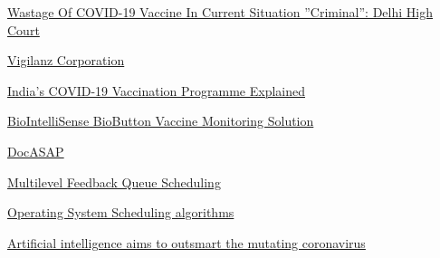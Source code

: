\documentclass[10pt,twocolumn,letterpaper]{article}
\begin{document}
\begin{thebibliography}{9}

\href{https://www.ndtv.com/india-news/delhi-high-court-says-wastage-of-covid-19-vaccine-in-current-situation-criminal-2418287}{Wastage Of COVID-19 Vaccine In Current Situation ''Criminal'': Delhi High Court}

\href{https://vigilanzcorp.com/}{Vigilanz Corporation}

\href{https://swachhindia.ndtv.com/indias-covid-19-vaccination-programme-explained-what-is-co-win-vaccine-delivery-management-system-all-you-need-to-know-55043/}{India’s COVID-19 Vaccination Programme Explained}

\href{https://biointellisense.com/biobutton}{BioIntelliSense BioButton Vaccine Monitoring Solution}

\href{https://docasap.com/}{DocASAP}

\href{https://www.geeksforgeeks.org/multilevel-feedback-queue-scheduling-mlfq-cpu-scheduling/}{Multilevel Feedback Queue Scheduling }

\bibitem{}
\href{https://www.tutorialspoint.com/operating_system/os_process_scheduling_algorithms.htm}{Operating System Scheduling algorithms
}

\href {https://news.usc.edu/181226/artificial-intelligence-ai-coronavirus-vaccines-mutations-usc-research/}{Artificial intelligence aims to outsmart the mutating coronavirus}

\end{thebibliography}
\end{document}
